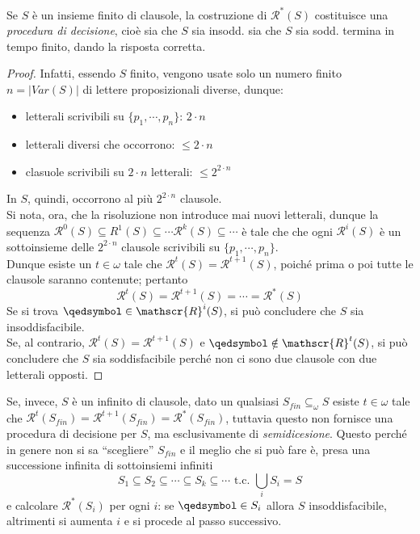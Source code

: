 \begin{oss}
Se $S$ è un insieme finito di clausole, la costruzione di $\mathscr{R}^*(S)$ costituisce una \textit{procedura di decisione}, cioè sia che $S$ sia insodd. sia che $S$ sia sodd. termina in tempo finito, dando la risposta corretta.
\end{oss}
\begin{proof} Infatti, essendo $S$ finito, vengono usate solo un numero finito $n = |Var(S)|$ di lettere proposizionali diverse, dunque:
\begin{itemize}
  \item letterali scrivibili su $\{p_1, \cdots, p_n\}$: $2 \cdot n$
  \item letterali diversi che occorrono: $\leq 2 \cdot n$ 
  \item clasuole scrivibili su $2 \cdot n$ letterali: $\leq 2^{2 \cdot n}$
\end{itemize} 
In $S$, quindi, occorrono al più $2^{2 \cdot n}$ clausole. \\
Si nota, ora, che la risoluzione non introduce mai nuovi letterali, dunque la sequenza $\mathscr{R}^{0}(S) \subseteq R^1(S) \subseteq \cdots \mathscr{R}^{k}(S) \subseteq \cdots$ è tale che  che ogni $\mathscr{R}^{i}(S)$ è un sottoinsieme delle $2^{2 \cdot n}$ clausole 
scrivibili su $\{p_1, \cdots, p_n\}$. \\
Dunque esiste un $t \in \omega$ tale che $\mathscr{R}^{t}(S) = \mathscr{R}^{t+1}(S)$, poiché prima o poi tutte le clausole saranno contenute; 
pertanto
$$
\mathscr{R}^{t}(S) = \mathscr{R}^{t+1}(S) = \cdots = \mathscr{R}^*(S)
$$
Se si trova $\qedsymbol \in \mathscr{R}^i(S)$, si può concludere che $S$ sia insoddisfacibile. \\
Se, al contrario, $\mathscr{R}^t(S) = \mathscr{R}^{t+1}(S)$ e $\qedsymbol \notin \mathscr{R}^t(S)$, si può concludere che $S$ sia soddisfacibile perché non ci sono due clausole con due letterali opposti.
\end{proof}
\begin{oss}
Se, invece, $S$ è un infinito di clausole, dato un qualsiasi $S_{fin} \subseteq_\omega S$ esiste $t \in \omega$ tale che $\mathscr{R}^t(S_{fin}) = \mathscr{R}^{t+1}(S_{fin}) = \mathscr{R}^*(S_{fin})$, tuttavia questo non fornisce una procedura di decisione per $S$, ma esclusivamente di \textit{semidicesione}. Questo perché in genere non si sa ``scegliere'' $S_{fin}$ e il meglio che si può fare è, presa una successione infinita di sottoinsiemi infiniti
$$
S_1 \subseteq S_2 \subseteq \cdots \subseteq S_k  \subseteq \cdots \text{ t.c. } \bigcup_i S_i = S
$$
e calcolare $\mathscr{R}^*(S_i)$ per ogni $i$: se $\qedsymbol \in S_i$ allora $S$ insoddisfacibile, altrimenti si aumenta $i$ e si procede al passo successivo.
\end{oss}

